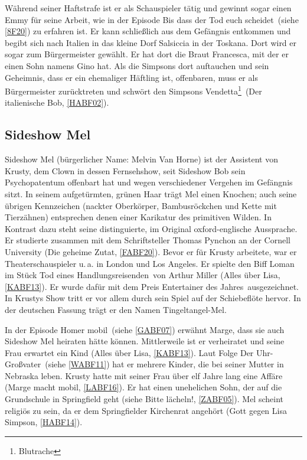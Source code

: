 Während seiner Haftstrafe ist er als Schauspieler tätig und gewinnt sogar einen Emmy für seine Arbeit, wie in der Episode \glqq Bis dass der Tod euch scheidet\grqq\ (siehe \ref{8F20}) zu erfahren ist. Er kann schließlich aus dem Gefängnis entkommen und begibt sich nach Italien in das kleine Dorf Salsiccia in der Toskana. Dort wird er sogar zum Bürgermeister gewählt. Er hat dort die Braut Francesca, mit der er einen Sohn namens Gino hat. Als die Simpsons dort auftauchen und sein Geheimnis, dass er ein ehemaliger Häftling ist, offenbaren, muss er als Bürgermeister zurücktreten und schwört den Simpsons \glqq Vendetta\footnote{Blutrache}\grqq\ (\glqq Der italienische Bob\grqq , \ref{HABF02}).

\subsection{Sideshow Mel}\label{MelvinVanHorne}
Sideshow Mel (bürgerlicher Name: Melvin Van Horne) ist der Assistent von Krusty, dem Clown in dessen Fernsehshow, seit Sideshow Bob sein Psychopatentum offenbart hat und wegen verschiedener Vergehen im Gefängnis sitzt. In seinem aufgetürmten, grünen Haar trägt Mel einen Knochen; auch seine übrigen Kennzeichen (nackter Oberkörper, Bambusröckchen und Kette mit Tierzähnen) entsprechen denen einer Karikatur des \glqq primitiven Wilden\grqq . In Kontrast dazu steht seine distinguierte, im Original oxford-englische Aussprache. Er studierte zusammen mit dem Schriftsteller Thomas Pynchon an der Cornell University (\glqq Die geheime Zutat\grqq , \ref{FABF20}). Bevor er für Krusty arbeitete, war er Theaterschauspieler u.\,a. in London und Los Angeles. Er spielte den Biff Loman im Stück \glqq Tod eines Handlungsreisenden\grqq\ von Arthur Miller (\glqq Alles über Lisa\grqq , \ref{KABF13}). Er wurde dafür mit dem Preis \glqq Entertainer des Jahres\grqq\ ausgezeichnet. In Krustys Show tritt er vor allem durch sein Spiel auf der Schiebeflöte hervor. In der deutschen Fassung trägt er den Namen Tingeltangel-Mel.

In der Episode \glqq Homer mobil\grqq\ (siehe \ref{GABF07}) erwähnt Marge, dass sie auch Sideshow Mel heiraten hätte können. Mittlerweile ist er verheiratet und seine Frau erwartet ein Kind (\glqq Alles über Lisa\grqq , \ref{KABF13}). Laut Folge \glqq Der Uhr-Großvater\grqq\ (siehe \ref{WABF11}) hat er mehrere Kinder, die bei seiner Mutter in Nebraska leben. Krusty hatte mit seiner Frau über elf Jahre lang eine Affäre (\glqq Marge macht mobil\grqq , \ref{LABF16}). Er hat einen unehelichen Sohn, der auf die Grundschule in Springfield geht (siehe \glqq Bitte lächeln!\grqq, \ref{ZABF05}). Mel scheint religiös zu sein, da er dem Springfielder Kirchenrat angehört (\glqq Gott gegen Lisa Simpson\grqq, \ref{HABF14}).

